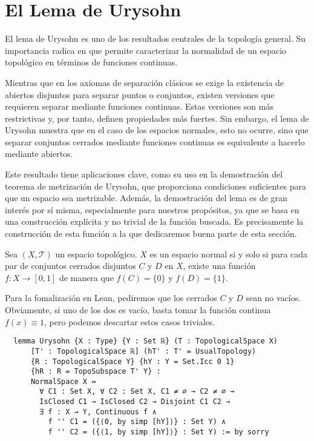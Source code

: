 

\section{El Lema de Urysohn}

El lema de Urysohn es uno de los resultados centrales de la topología general. Su importancia radica en que permite caracterizar la normalidad de un espacio topológico en términos de funciones continuas.

Mientras que en los axiomas de separación clásicos se exige la existencia de abiertos disjuntos para separar puntos o conjuntos, existen versiones que requieren separar mediante funciones continuas. Estas versiones son más restrictivas y, por tanto, definen propiedades más fuertes. Sin embargo, el lema de Urysohn muestra que en el caso de los espacios normales, esto no ocurre, sino que separar conjuntos cerrados mediante funciones continuas es equivalente a hacerlo mediante abiertos.

Este resultado tiene aplicaciones clave, como su uso en la demostración del teorema de metrización de Urysohn, que proporciona condiciones suficientes para que un espacio sea metrizable. Además, la demostración del lema es de gran interés por sí misma, especialmente para nuestros propósitos, ya que se basa en una construcción explícita y no trivial de la función buscada. Es precisamente la construcción de esta función a la que dedicaremos buena parte de esta sección.

\begin{theorem}{\cite[p.~102, 15.6. Urysohn's Lemma]{willard2012general}}
  Sea $(X, \mathcal{T})$ un espacio topológico. $X$ es un espacio normal si y solo si para cada par de conjuntos cerrados disjuntos $C$ y $D$ en $X$, existe una función $f : X \to [0, 1]$ de manera que $f(C) = \{0\}$ y $f(D) = \{1\}$.
\end{theorem}

Para la fomalización en Lean, pediremos que los cerrados $C$ y $D$ sean no vacíos. Obviamente, si uno de los dos es vacío, basta tomar la función continua $f(x) \equiv 1$, pero podemos descartar estos casos triviales.

\begin{lstlisting}
  lemma Urysohn {X : Type} {Y : Set ℝ} (T : TopologicalSpace X)
      [T' : TopologicalSpace ℝ] (hT' : T' = UsualTopology)
      {R : TopologicalSpace Y} {hY : Y = Set.Icc 0 1}
      {hR : R = TopoSubspace T' Y} :
      NormalSpace X ↔
        ∀ C1 : Set X, ∀ C2 : Set X, C1 ≠ ∅ → C2 ≠ ∅ →
        IsClosed C1 → IsClosed C2 → Disjoint C1 C2 →
        ∃ f : X → Y, Continuous f ∧
          f '' C1 = ({⟨0, by simp [hY]⟩} : Set Y) ∧
          f '' C2 = ({⟨1, by simp [hY]⟩} : Set Y) := by sorry
\end{lstlisting}

